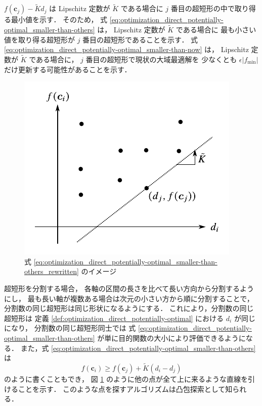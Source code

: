 $f(\bm{c}_j) - \tilde{K} d_j$ は
Lipschitz 定数が $\tilde{K}$ である場合に $j$ 番目の超短形の中で取り得る最小値を示す．
そのため，
式 \eqref{eq:optimization_direct_potentially-optimal_smaller-than-others} は，
Lipschitz 定数が $\tilde{K}$ である場合に
最も小さい値を取り得る超短形が $j$ 番目の超短形であることを示す．
式 \eqref{eq:optimization_direct_potentially-optimal_smaller-than-now} は，
Lipschitz 定数が $\tilde{K}$ である場合に，
$j$ 番目の超短形で現状の大域最適解を
少なくとも $\epsilon |f_{\text{min}}|$ だけ更新する可能性があることを示す．

\begin{figure}[tp]
    \centering
    \includegraphics[width=0.7\linewidth]{optimization/DIRECT-potentially-optimal.pdf}
    \caption{式 \eqref{eq:optimization_direct_potentially-optimal_smaller-than-others_rewritten} のイメージ}
    \label{fig:optimization_direct_potentially-optimal_smaller-than-others-image}
\end{figure}

超短形を分割する場合，
各軸の区間の長さを比べて長い方向から分割するようにし，
最も長い軸が複数ある場合は次元の小さい方から順に分割することで，
分割数の同じ超短形は同じ形状になるようにする．
これにより，分割数の同じ超短形は
定義 \ref{def:optimization_direct_potentially-optimal} における $d_i$ が同じになり，
分割数の同じ超短形同士では
式 \eqref{eq:optimization_direct_potentially-optimal_smaller-than-others}
が単に目的関数の大小により評価できるようになる．
また，式 \eqref{eq:optimization_direct_potentially-optimal_smaller-than-others} は
\begin{equation}
    f(\bm{c}_i) \ge f(\bm{c}_j) + \tilde{K} (d_i - d_j)
    \label{eq:optimization_direct_potentially-optimal_smaller-than-others_rewritten}
\end{equation}
のように書くこともでき，
図 \ref{fig:optimization_direct_potentially-optimal_smaller-than-others-image}
のように他の点が全て上に来るような直線を引けることを示す．
このような点を探すアルゴリズムは凸包探索として知られる．

